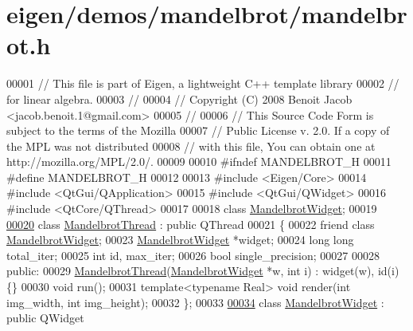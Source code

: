 \hypertarget{eigen_2demos_2mandelbrot_2mandelbrot_8h_source}{}\section{eigen/demos/mandelbrot/mandelbrot.h}
\label{eigen_2demos_2mandelbrot_2mandelbrot_8h_source}

\begin{DoxyCode}
00001 \textcolor{comment}{// This file is part of Eigen, a lightweight C++ template library}
00002 \textcolor{comment}{// for linear algebra.}
00003 \textcolor{comment}{//}
00004 \textcolor{comment}{// Copyright (C) 2008 Benoit Jacob <jacob.benoit.1@gmail.com>}
00005 \textcolor{comment}{//}
00006 \textcolor{comment}{// This Source Code Form is subject to the terms of the Mozilla}
00007 \textcolor{comment}{// Public License v. 2.0. If a copy of the MPL was not distributed}
00008 \textcolor{comment}{// with this file, You can obtain one at http://mozilla.org/MPL/2.0/.}
00009 
00010 \textcolor{preprocessor}{#ifndef MANDELBROT\_H}
00011 \textcolor{preprocessor}{#define MANDELBROT\_H}
00012 
00013 \textcolor{preprocessor}{#include <Eigen/Core>}
00014 \textcolor{preprocessor}{#include <QtGui/QApplication>}
00015 \textcolor{preprocessor}{#include <QtGui/QWidget>}
00016 \textcolor{preprocessor}{#include <QtCore/QThread>}
00017 
00018 \textcolor{keyword}{class }\hyperlink{class_mandelbrot_widget}{MandelbrotWidget};
00019 
\hyperlink{class_mandelbrot_thread}{00020} \textcolor{keyword}{class }\hyperlink{class_mandelbrot_thread}{MandelbrotThread} : \textcolor{keyword}{public} QThread
00021 \{
00022     \textcolor{keyword}{friend} \textcolor{keyword}{class }\hyperlink{class_mandelbrot_widget}{MandelbrotWidget};
00023     \hyperlink{class_mandelbrot_widget}{MandelbrotWidget} *widget;
00024     \textcolor{keywordtype}{long} \textcolor{keywordtype}{long} total\_iter;
00025     \textcolor{keywordtype}{int} id, max\_iter;
00026     \textcolor{keywordtype}{bool} single\_precision;
00027 
00028   \textcolor{keyword}{public}:
00029     \hyperlink{class_mandelbrot_thread}{MandelbrotThread}(\hyperlink{class_mandelbrot_widget}{MandelbrotWidget} *w, \textcolor{keywordtype}{int} i) : widget(w), id(i) \{\}
00030     \textcolor{keywordtype}{void} run();
00031     \textcolor{keyword}{template}<\textcolor{keyword}{typename} Real> \textcolor{keywordtype}{void} render(\textcolor{keywordtype}{int} img\_width, \textcolor{keywordtype}{int} img\_height);
00032 \};
00033 
\hyperlink{class_mandelbrot_widget}{00034} \textcolor{keyword}{class }\hyperlink{class_mandelbrot_widget}{MandelbrotWidget} : \textcolor{keyword}{public} QWidget

\end{DoxyCode}
